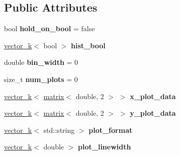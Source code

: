 \subsection*{Public Attributes}
\begin{DoxyCompactItemize}
\item 
\hypertarget{classkeycpp_1_1_plots_afe961c1f35d88bc181bd426fc47ade00}{bool {\bfseries hold\-\_\-on\-\_\-bool} = false}\label{classkeycpp_1_1_plots_afe961c1f35d88bc181bd426fc47ade00}

\item 
\hypertarget{classkeycpp_1_1_plots_a2ca8aa3e36820c128a2d43b8c4349940}{\hyperlink{classkeycpp_1_1vector__k}{vector\-\_\-k}$<$ bool $>$ {\bfseries hist\-\_\-bool}}\label{classkeycpp_1_1_plots_a2ca8aa3e36820c128a2d43b8c4349940}

\item 
\hypertarget{classkeycpp_1_1_plots_a69bc4d0c87b7467113e164f592321fa5}{double {\bfseries bin\-\_\-width} = 0}\label{classkeycpp_1_1_plots_a69bc4d0c87b7467113e164f592321fa5}

\item 
\hypertarget{classkeycpp_1_1_plots_ad3b0aabd8ea6dc14a690fe6b1e37852d}{size\-\_\-t {\bfseries num\-\_\-plots} = 0}\label{classkeycpp_1_1_plots_ad3b0aabd8ea6dc14a690fe6b1e37852d}

\item 
\hypertarget{classkeycpp_1_1_plots_abc542d4f61792924a474bf4663cfef25}{\hyperlink{classkeycpp_1_1vector__k}{vector\-\_\-k}$<$ \hyperlink{classkeycpp_1_1matrix}{matrix}$<$ double, 2 $>$ $>$ {\bfseries x\-\_\-plot\-\_\-data}}\label{classkeycpp_1_1_plots_abc542d4f61792924a474bf4663cfef25}

\item 
\hypertarget{classkeycpp_1_1_plots_ae70f4979635019e35e72bb7c379d89ad}{\hyperlink{classkeycpp_1_1vector__k}{vector\-\_\-k}$<$ \hyperlink{classkeycpp_1_1matrix}{matrix}$<$ double, 2 $>$ $>$ {\bfseries y\-\_\-plot\-\_\-data}}\label{classkeycpp_1_1_plots_ae70f4979635019e35e72bb7c379d89ad}

\item 
\hypertarget{classkeycpp_1_1_plots_a8665d63b8f7098941f9c6e9369edae3c}{\hyperlink{classkeycpp_1_1vector__k}{vector\-\_\-k}$<$ std\-::string $>$ {\bfseries plot\-\_\-format}}\label{classkeycpp_1_1_plots_a8665d63b8f7098941f9c6e9369edae3c}

\item 
\hypertarget{classkeycpp_1_1_plots_a5229077ae64f278530c2c153c6925e7d}{\hyperlink{classkeycpp_1_1vector__k}{vector\-\_\-k}$<$ double $>$ {\bfseries plot\-\_\-linewidth}}\label{classkeycpp_1_1_plots_a5229077ae64f278530c2c153c6925e7d}


\end{DoxyCompactItemize}
